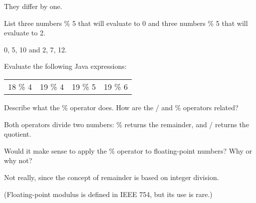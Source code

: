 \begin{answer}
They differ by one.
\end{answer}


\Q List three numbers \% 5 that will evaluate to 0 and three numbers \% 5 that will evaluate to 2.

\begin{answer}
0, 5, 10 and 2, 7, 12.
\end{answer}


\Q Evaluate the following Java expressions:

\begin{center}
\begin{tabular}{C{1in}C{1in}C{1in}C{1in}}
18 \% 4  &
19 \% 4  &
19 \% 5  &
19 \% 6  \\
\end{tabular}
\end{center}


\Q Describe what the \% operator does.
How are the / and \% operators related?

\begin{answer}
Both operators divide two numbers: \% returns the remainder, and / returns the quotient.
\end{answer}


\Q Would it make sense to apply the \% operator to floating-point numbers?
Why or why not?

\begin{answer}
Not really, since the concept of remainder is based on integer division.

(Floating-point modulus is defined in IEEE 754, but its use is rare.)
\end{answer}


